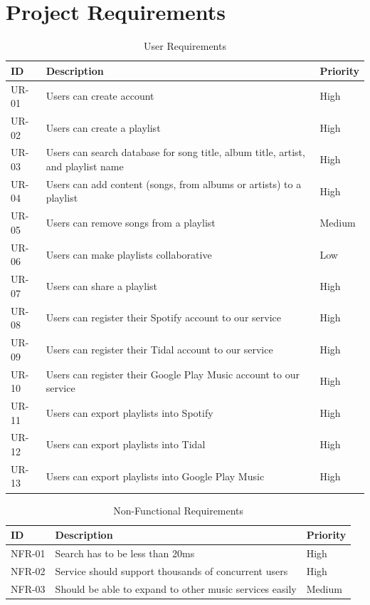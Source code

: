 \documentclass[12pt]{article}
\begin{document}
	\section{Project Requirements}
	\begin{table}[H]
		\centering
		\label{tab:ur}
		\caption*{User Requirements}
		\begin{tabularx}{450pt}{lXl}
			ID & Description & Priority\\\hline
			UR-01 & Users can create account & High \\
			UR-02 & Users can create a playlist & High \\
			UR-03 & Users can search database for song title, album title,
			artist, and playlist name & High \\
			UR-04 & Users can add content (songs, from albums or artists) to a playlist & High \\
			UR-05 & Users can remove songs from a playlist & Medium \\
			UR-06 & Users can make playlists collaborative & Low \\
			UR-07 & Users can share a playlist & High \\
			UR-08 & Users can register their Spotify account to our service & High \\
			UR-09 & Users can register their Tidal account to our service & High \\
			UR-10 & Users can register their Google Play Music account to our service & High \\
			UR-11 & Users can export playlists into Spotify & High \\
			UR-12 & Users can export playlists into Tidal & High \\
			UR-13 & Users can export playlists into Google Play Music & High \\
		\end{tabularx}
	\end{table}
	\begin{table}[H]
		\centering
		\label{tab:nfr}
		\caption*{Non-Functional Requirements}
		\begin{tabularx}{450pt}{lXl}
			ID & Description & Priority\\\hline
			NFR-01 & Search has to be less than 20ms & High \\
			NFR-02 & Service should support thousands of concurrent users & High \\
			NFR-03 & Should be able to expand to other music services easily & Medium \\
		\end{tabularx}
	\end{table}
\end{document}

